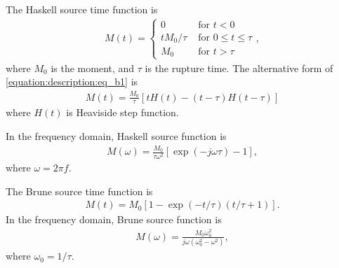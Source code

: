 \documentclass[letterpaper,10pt,english]{sphinxmanual}
\begin{document}
\sphinxAtStartPar
The Haskell source time function is
\begin{equation}\label{equation:description:eq_b1}
\begin{split}M\left( t \right)= \begin{cases}
0 & \text{ for } t < 0 \\
tM_0/\tau & \text{ for } 0 \leqslant  t \leqslant \tau \\
M_0 & \text{ for } t > \tau
\end{cases},\end{split}
\end{equation}
\sphinxAtStartPar
where \(M_0\) is the moment, and \(\tau\) is the rupture time.
The alternative form of \eqref{equation:description:eq_b1} is
\begin{equation*}
\begin{split}M\left( t \right) = \frac{M_0}{\tau}\left[ tH\left( t \right)-\left( t-\tau \right)H\left( t-\tau \right) \right]\end{split}
\end{equation*}
\sphinxAtStartPar
where \(H\left( t \right)\) is Heaviside step function.

\sphinxAtStartPar
In the frequency domain, Haskell source function is
\begin{equation}\label{equation:description:eq_b2}
\begin{split}M\left( \omega \right) = \frac{M_0}{\tau\omega^2}\left[ \exp\left( -j\omega\tau \right)-1 \right],\end{split}
\end{equation}
\sphinxAtStartPar
where \(\omega=2\pi f\).

\sphinxAtStartPar
The Brune source time function is
\begin{equation}\label{equation:description:eq_b3}
\begin{split}M\left( t \right) = M_0\left[ 1 - \exp\left( -t/ \tau \right)\left( t/ \tau +1 \right) \right].\end{split}
\end{equation}
\sphinxAtStartPar
In the frequency domain, Brune source function is
\begin{equation}\label{equation:description:eq_b4}
\begin{split}M\left( \omega \right) = \frac{M_0\omega_0^2}{j\omega\left( \omega_0^2-\omega^2  \right)},\end{split}
\end{equation}
\sphinxAtStartPar
where \(\omega_0=1 / \tau\).
\end{document}

